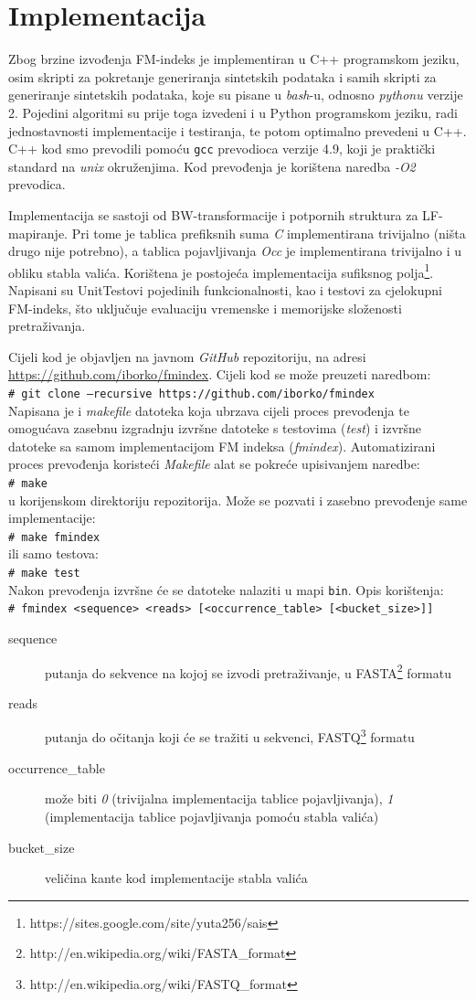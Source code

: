 \documentclass[times, utf8, seminar, numeric]{fer}
\newcommand{\shellcmd}[1]{\\\indent\indent\texttt{\footnotesize\# #1}\\}
\begin{document}
\section{Implementacija}

Zbog brzine izvođenja FM-indeks je implementiran u C++ programskom jeziku, osim skripti za pokretanje generiranja sintetskih podataka i samih skripti za generiranje sintetskih podataka, koje su pisane u \textit{bash}-u, odnosno \textit{pythonu} verzije 2.
Pojedini algoritmi su prije toga izvedeni i u Python programskom jeziku, radi
jednostavnosti implementacije i testiranja, te potom optimalno prevedeni u
C++. C++ kod smo prevodili pomoću \texttt{gcc} prevodioca verzije 4.9, koji je praktički standard na \textit{unix} okruženjima. Kod prevođenja je korištena naredba \textit{-O2} prevodica.

Implementacija se sastoji od BW-transformacije i potpornih struktura za LF-mapiranje.
Pri tome je tablica prefiksnih suma \textit{C} implementirana trivijalno (ništa
drugo nije potrebno), a tablica pojavljivanja \textit{Occ} je implementirana
trivijalno i u obliku stabla valića. Korištena je postojeća implementacija sufiksnog
polja\footnote{https://sites.google.com/site/yuta256/sais}. Napisani su UnitTestovi
pojedinih funkcionalnosti, kao i testovi za cjelokupni FM-indeks, što uključuje
evaluaciju vremenske i memorijske složenosti pretraživanja.

Cijeli kod je objavljen na javnom \textit{GitHub} repozitoriju, na adresi \url{https://github.com/iborko/fmindex}. Cijeli kod se može preuzeti naredbom:
\shellcmd{git clone --recursive https://github.com/iborko/fmindex}

Napisana je i \textit{makefile} datoteka koja ubrzava cijeli proces prevođenja te omogućava zasebnu izgradnju izvršne datoteke s testovima (\textit{test}) i izvršne datoteke sa samom implementacijom FM indeksa (\textit{fmindex}). Automatizirani proces prevođenja koristeći \textit{Makefile} alat se pokreće upisivanjem naredbe:
\shellcmd{make}
u korijenskom direktoriju repozitorija. Može se pozvati i zasebno prevođenje same implementacije:
\shellcmd{make fmindex}
ili samo testova:
\shellcmd{make test}

\noindent Nakon prevođenja izvršne će se datoteke nalaziti u mapi \texttt{bin}. Opis korištenja:
\shellcmd{fmindex <sequence> <reads> [<occurrence\_table> [<bucket\_size>]]}
\begin{description}
  \item[sequence] putanja do sekvence  na kojoj se izvodi pretraživanje, u FASTA\footnote{http://en.wikipedia.org/wiki/FASTA\_format} formatu
  \item[reads] putanja do očitanja  koji će se tražiti u sekvenci, FASTQ\footnote{http://en.wikipedia.org/wiki/FASTQ\_format} formatu
  \item[occurrence\_table] može biti \textit{0} (trivijalna implementacija tablice pojavljivanja), \textit{1} (implementacija tablice pojavljivanja pomoću stabla valića)
  \item[bucket\_size] veličina kante kod implementacije stabla valića
\end{description}
\end{document}
